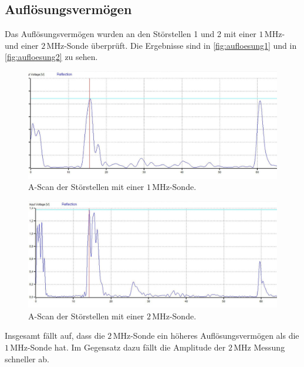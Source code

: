 \subsection{Auflösungsvermögen}
\label{sec:Aufloesungvermoegen}
Das Auflösungsvermögen wurden an den Störstellen 1 und 2 mit einer $1\,\unit{\mega\hertz}$- und einer
$2\,\unit{\mega\hertz}$-Sonde überprüft. Die Ergebnisse sind in \autoref{fig:aufloesung1}  und in
\autoref{fig:aufloesung2} zu sehen.
\begin{figure}
    \centering
    \includegraphics{messwerte/UntersuchungAufloesungsvermoegen/1MhzNo1.jpg}
    \caption{A-Scan der Störstellen mit einer $1\,\unit{\mega\hertz}$-Sonde.}
    \label{fig:aufloesung1}
\end{figure}

\begin{figure}
  \centering
  \includegraphics{messwerte/UntersuchungAufloesungsvermoegen/2MhzNo1.jpg}
  \caption{A-Scan der Störstellen mit einer $2\,\unit{\mega\hertz}$-Sonde.}
  \label{fig:aufloesung2}
\end{figure}
Insgesamt fällt auf, dass die $2\,\unit{\mega\hertz}$-Sonde ein höheres Auflösungsvermögen
als die $1\,\unit{\mega\hertz}$-Sonde hat. Im Gegensatz dazu fällt die Amplitude der $2\,\unit{\mega\hertz}$
Messung schneller ab.

